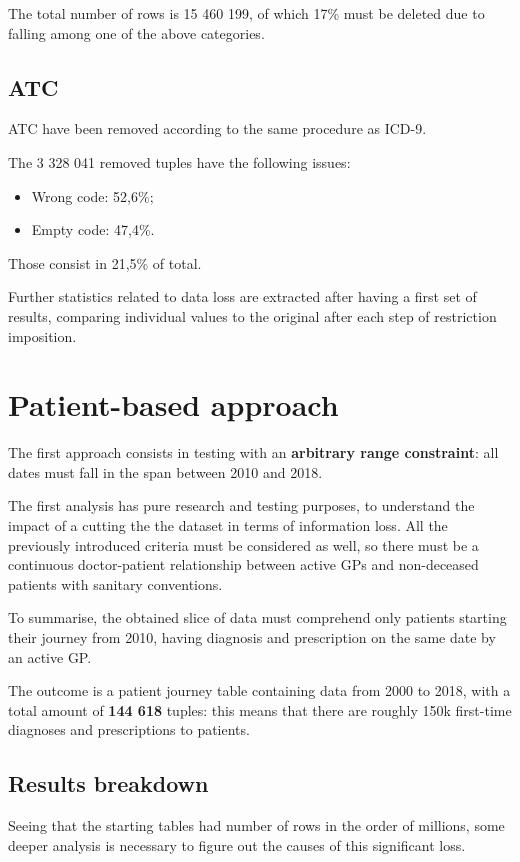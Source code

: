 The total number of rows is 15 460 199, of which 17\% must be deleted due to falling among one of the above categories.

\subsection{ATC}
ATC have been removed according to the same procedure as ICD-9.

The 3 328 041 removed tuples have the following issues:
\begin{itemize}
	\item Wrong code: 52,6\%;
	\item Empty code: 47,4\%.
\end{itemize}

Those consist in 21,5\% of total.

Further statistics related to data loss are extracted after having a first set of results, comparing individual values to the original after each step of restriction imposition. 

\section{Patient-based approach}
The first approach consists in testing with an \textbf{arbitrary range constraint}: all dates must fall in the span between 2010 and 2018.

The first analysis has pure research and testing purposes, to understand the impact of a cutting the the dataset in terms of information loss. All the previously introduced criteria must be considered as well, so there must be a continuous doctor-patient relationship between active GPs and non-deceased patients with sanitary conventions.

To summarise, the obtained slice of data must comprehend only patients starting their journey from 2010, having diagnosis and prescription on the same date by an active GP.

The outcome is a patient journey table containing data from 2000 to 2018, with a total amount of \textbf{144 618} tuples: this means that there are roughly 150k first-time diagnoses and prescriptions to patients. 

\subsection{Results breakdown}
Seeing that the starting tables had number of rows in the order of millions, some deeper analysis is necessary to figure out the causes of this significant loss.

